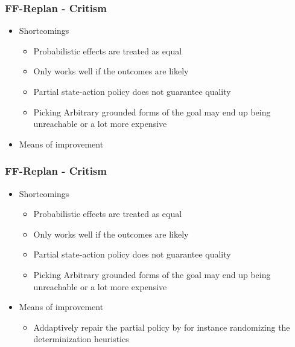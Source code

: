 \documentclass{beamer}
\let\origframetitle=\frametitle
\renewcommand\frametitle[1]{\origframetitle{\textbf{\large{\textrm{#1}}}}}
\begin{document}
\begin{frame}
  \frametitle{FF-Replan - Critism}
  \begin{itemize}
    \item Shortcomings
      \begin{itemize}
        \item Probabilistic effects are treated as equal
        \item Only works well if the outcomes are likely
	\item Partial state-action policy does not guarantee quality
	\item Picking Arbitrary grounded forms of the goal may end up being unreachable or a lot more expensive
      \end{itemize}
    \item Means of improvement
   \end{itemize}
\end{frame}


\begin{frame}
  \frametitle{FF-Replan - Critism}
  \begin{itemize}
    \item Shortcomings
      \begin{itemize}
        \item Probabilistic effects are treated as equal
        \item Only works well if the outcomes are likely
	\item Partial state-action policy does not guarantee quality
	\item Picking Arbitrary grounded forms of the goal may end up being unreachable or a lot more expensive
      \end{itemize}
    \item Means of improvement
      \begin{itemize}
        \item Addaptively repair the partial policy by for instance randomizing the determinization heuristics
      \end{itemize}
   \end{itemize}
\end{frame}
\end{document}
